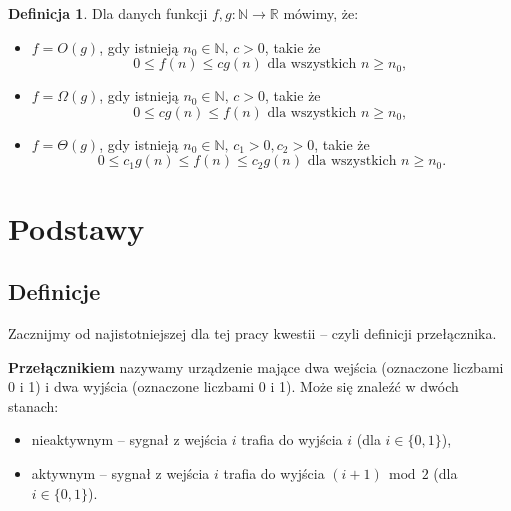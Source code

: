 \documentclass[a4paper]{article}
\renewcommand{\mod}{\, \operatorname{mod} \,}
\newcommand{\td}{\text{.}}
\newcommand{\tc}{\text{, }}
\newcommand{\N}{\mathbb{N}}
\newcommand{\R}{\mathbb{R}}
\theoremstyle{definition}
\newtheorem{df}[tw]{Definicja}
\begin{document}
\begin{df}
    Dla danych funkcji \(f, g : \N \to \R\) mówimy, że:
    \begin{itemize}
        \item \(f = O(g)\), gdy istnieją \( n_0 \in \N, \,  c > 0\), takie że 
        \[
            0 \leq f(n) \leq cg(n)  \text{ dla wszystkich } n \geq n_0 \tc
        \]
        \item \(f = \Omega(g)\), gdy istnieją \( n_0 \in \N, \,  c > 0\), takie że 
        \[
            0 \leq cg(n) \leq f(n)  \text{ dla wszystkich } n \geq n_0 \tc
        \]
        \item  \(f = \Theta(g)\), gdy istnieją \( n_0 \in \N, \,  c_1 > 0, c_2 > 0\), takie że 
        \[
            0 \leq c_1 g(n) \leq f(n) \leq c_2 g(n)  \text{ dla wszystkich } n \geq n_0 \td
        \]
    \end{itemize}
\end{df}



\section{Podstawy}

\subsection{Definicje}

Zacznijmy od najistotniejszej dla tej pracy kwestii -- czyli definicji przełącznika.

\vspace{1em}

{\bf Przełącznikiem} nazywamy urządzenie mające dwa wejścia (oznaczone liczbami 0 i 1)  i dwa wyjścia (oznaczone liczbami 0 i 1). Może się znaleźć w dwóch stanach:

\begin{itemize}
    \item nieaktywnym -- sygnał z wejścia \(i\) trafia do wyjścia \(i\) (dla \(i \in \{0,1\}\)),
    \item  aktywnym -- sygnał z wejścia \(i\) trafia do wyjścia \((i+1) \mod 2\) (dla \(i \in \{0,1\}\)).
\end{itemize}
\end{document}
